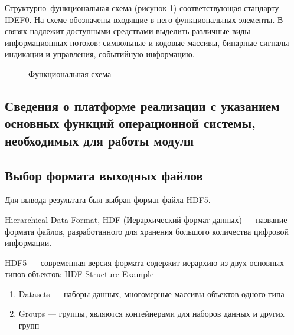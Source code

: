 Структурно--функциональная схема (рисунок \ref{pic:idef0}) соответствующая стандарту IDEF0. На схеме обозначены входящие в него функциональных элементы. В связях надлежит доступными средствами выделить различные виды информационных потоков: символьные и кодовые массивы, бинарные сигналы индикации и управления, событийную информацию.

\begin{figure}[h!]
\caption{Функциональная схема}
\label{pic:idef0}
\end{figure}

\subsection{Сведения о платформе реализации с указанием основных функций операционной системы, необходимых для работы модуля}


\subsection {Выбор формата выходных файлов}
Для вывода результата был выбран формат файла HDF5. 

Hierarchical Data Format, HDF (Иерархический формат данных) — название формата файлов, разработанного для хранения большого количества цифровой информации.

HDF5 — современная версия формата содержит иерархию из двух основных типов объектов:
HDF-Structure-Example
\begin{enumerate}
\item Datasets — наборы данных, многомерные массивы объектов одного типа
\item Groups — группы, являются контейнерами для наборов данных и других групп
\end{enumerate}
    

